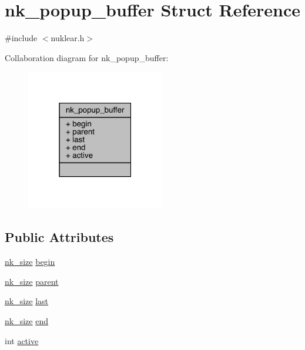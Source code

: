 \hypertarget{structnk__popup__buffer}{}\section{nk\+\_\+popup\+\_\+buffer Struct Reference}
\label{structnk__popup__buffer}


{\ttfamily \#include $<$nuklear.\+h$>$}



Collaboration diagram for nk\+\_\+popup\+\_\+buffer\+:
\nopagebreak
\begin{figure}[H]
\begin{center}
\leavevmode
\includegraphics[width=171pt]{structnk__popup__buffer__coll__graph}
\end{center}
\end{figure}
\subsection*{Public Attributes}
\begin{DoxyCompactItemize}
\item 
\mbox{\hyperlink{nuklear_8h_a84c0fc50dec5501be327b33d41d9010c}{nk\+\_\+size}} \mbox{\hyperlink{structnk__popup__buffer_ae93e42070c567aa61352d9c832496c77}{begin}}
\item 
\mbox{\hyperlink{nuklear_8h_a84c0fc50dec5501be327b33d41d9010c}{nk\+\_\+size}} \mbox{\hyperlink{structnk__popup__buffer_aff97e8d18ec464a77bf28be1b9f54bf7}{parent}}
\item 
\mbox{\hyperlink{nuklear_8h_a84c0fc50dec5501be327b33d41d9010c}{nk\+\_\+size}} \mbox{\hyperlink{structnk__popup__buffer_ab4c3e21e03a4428e92d375efe384add0}{last}}
\item 
\mbox{\hyperlink{nuklear_8h_a84c0fc50dec5501be327b33d41d9010c}{nk\+\_\+size}} \mbox{\hyperlink{structnk__popup__buffer_a630c901d09e64b5945e5a9c760153496}{end}}
\item 
int \mbox{\hyperlink{structnk__popup__buffer_a4553982d21151ff00fd95c1abc709ef6}{active}}
\end{DoxyCompactItemize}


